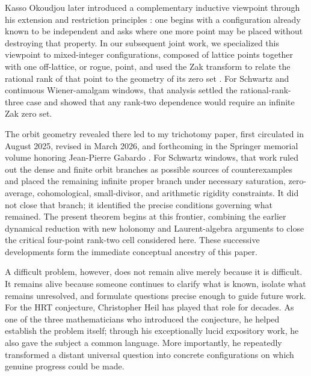 \documentclass[reqno]{amsart}
\theoremstyle{remark}
\numberwithin{equation}{section}
\begin{document}
Kasso Okoudjou later introduced a complementary inductive viewpoint through
his extension and restriction principles \cite{OkoudjouExtension}: one begins
with a configuration already known to be independent and asks where one more
point may be placed without destroying that property. In our subsequent joint
work, we specialized this viewpoint to mixed-integer configurations, composed
of lattice points together with one off-lattice, or rogue, point, and used the
Zak transform to relate the rational rank of that point to the geometry of its
zero set \cite{OkoudjouOussa}. For Schwartz and continuous Wiener-amalgam
windows, that analysis settled the rational-rank-three case and showed that
any rank-two dependence would require an infinite Zak zero set.

The orbit geometry revealed there led to my trichotomy paper, first circulated
in August 2025, revised in March 2026, and forthcoming in the Springer memorial volume honoring Jean-Pierre Gabardo \cite{OussaTrichotomy}. For Schwartz windows, that work ruled out the dense and finite orbit branches as possible
sources of counterexamples and placed the remaining infinite proper branch
under necessary saturation, zero-average, cohomological, small-divisor, and
arithmetic rigidity constraints. It did not close that branch; it identified
the precise conditions governing what remained. The present theorem begins at
this frontier, combining the earlier dynamical reduction with new holonomy and
Laurent-algebra arguments to close the critical four-point rank-two cell
considered here. These successive developments form the immediate conceptual
ancestry of this paper. 

A difficult problem, however, does not remain alive merely because it is
difficult. It remains alive because someone continues to clarify what is
known, isolate what remains unresolved, and formulate questions precise
enough to guide future work. For the HRT conjecture, Christopher Heil has
played that role for decades. As one of the three mathematicians who
introduced the conjecture, he helped establish the problem itself; through
his exceptionally lucid expository work, he also gave the subject a common
language. More importantly, he repeatedly transformed a distant universal
question into concrete configurations on which genuine progress could be
made.
\end{document}

